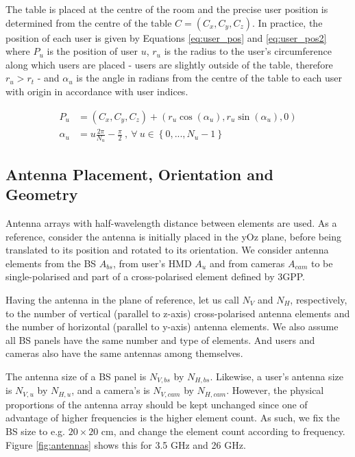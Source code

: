 \vspace{.6cm}

The table is placed at the centre of the room and the precise user position is determined from the centre of the table $C = (C_x, C_y, C_z)$. In practice, the position of each user is given by Equations \eqref{eq:user_pos} and \eqref{eq:user_pos2} where $P_u$ is the position of user $u$, $r_u$ is the radius to the user's circumference along which users are placed - users are slightly outside of the table, therefore $r_u > r_t$ - and $\alpha_u$ is the angle in radians from the centre of the table to each user with origin in accordance with user indices. 

\begin{align} 
    P_u &= (C_x, C_y, C_z) + (r_u \cos(\alpha_u), r_u \sin(\alpha_u), 0) \label{eq:user_pos} \\
    \alpha_u &= u  \frac{2 \pi}{N_u} - \frac{\pi}{2} \ , \ \forall \ u \in \left\{0, ..., N_u - 1\right\} \label{eq:user_pos2}
\end{align}

\subsection{Antenna Placement, Orientation and Geometry}

Antenna arrays with half-wavelength distance between elements are used. As a reference, consider the antenna is initially placed in the yOz plane, before being translated to its position and rotated to its orientation. We consider antenna elements from the \ac{BS} $A_{bs}$, from user's \ac{HMD} $A_{u}$ and from cameras $A_{cam}$ to be single-polarised and part of a cross-polarised element defined by 3GPP. 

Having the antenna in the plane of reference, let us call $N_V$ and $N_H$, respectively, to the number of vertical (parallel to z-axis) cross-polarised antenna elements and the number of horizontal (parallel to y-axis) antenna elements. We also assume all BS panels have the same number and type of elements. And users and cameras also have the same antennas among themselves. 

The antenna size of a \ac{BS} panel is $N_{V,bs}$ by $N_{H,bs}$. Likewise, a user's antenna size is $N_{V,u}$ by $N_{H,u}$, and a camera's is $N_{V,cam}$ by $N_{H,cam}$. However, the physical proportions of the antenna array should be kept unchanged since one of advantage of higher frequencies is the higher element count. As such, we fix the BS size to e.g. $20 \times 20$ cm, and change the element count according to frequency. Figure \ref{fig:antennas} shows this for 3.5 GHz and 26 GHz.


